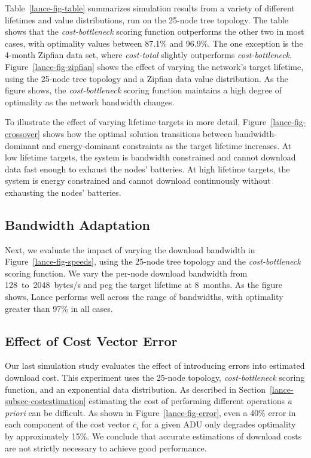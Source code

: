 Table~\ref{lance-fig-table} summarizes simulation results from a variety of
different lifetimes and value distributions, run on the 25-node tree
topology. The table shows that the \textit{cost-bottleneck} scoring function
outperforms the other two in most cases, with optimality values between
87.1\% and 96.9\%. The one exception is the 4-month Zipfian data set, where
\textit{cost-total} slightly outperforms \textit{cost-bottleneck}.
Figure~\ref{lance-fig-zipfian} shows the effect of varying the network's
target lifetime, using the 25-node tree topology and a Zipfian data value
distribution. As the figure shows, the \textit{cost-bottleneck} scoring
function maintains a high degree of optimality as the network bandwidth
changes.

\vfill\eject

To illustrate the effect of varying lifetime targets in more detail,
Figure~\ref{lance-fig-crossover} shows how the optimal solution transitions
between bandwidth-dominant and energy-dominant constraints as the target
lifetime increases. At low lifetime targets, the system is bandwidth
constrained and cannot download data fast enough to exhaust the nodes'
batteries. At high lifetime targets, the system is energy constrained and
cannot download continuously without exhausting the nodes' batteries.

\subsection{Bandwidth Adaptation}
\label{lance-sec-eval-params}

Next, we evaluate the impact of varying the download bandwidth in
Figure~\ref{lance-fig-speeds}, using the 25-node tree topology and the
\textit{cost-bottleneck} scoring function. We vary the per-node download
bandwidth from 128~to~2048~bytes/s and peg the target lifetime at 8~months.
As the figure shows, Lance performs well across the range of bandwidths, with
optimality greater than 97\% in all cases.

\subsection{Effect of Cost Vector Error}

Our last simulation study evaluates the effect of introducing errors into
estimated download cost. This experiment uses the 25-node topology,
\textit{cost-bottleneck} scoring function, and an exponential data
distribution. As described in Section~\ref{lance-subsec-costestimation}
estimating the cost of performing different operations \textit{a priori} can
be difficult. As shown in Figure~\ref{lance-fig-error}, even a 40\% error in
each component of the cost vector $\bar{c}_i$ for a given ADU only degrades
optimality by approximately 15\%. We conclude that accurate estimations of
download costs are not strictly necessary to achieve good performance.

